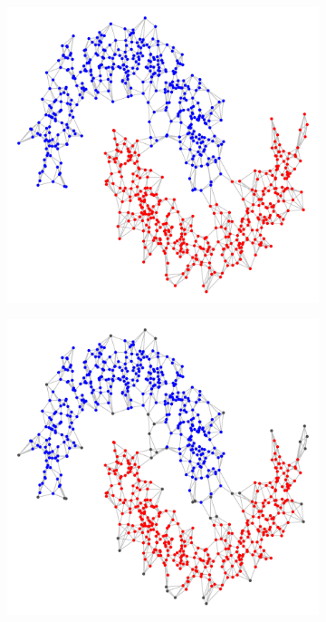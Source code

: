 \documentclass{article}
\newcommand{\1}{\mathbf{1}}
\theoremstyle{aldenthm}
\theoremstyle{aldenrmrk}
\begin{document}
\begin{figure}
\begin{adjustbox}{minipage=\linewidth}
\begin{subfigure}{.24\linewidth}
			\caption{}
		\end{subfigure}
		\begin{subfigure}{.24\linewidth}
			\includegraphics[width=\linewidth]{example2plots/row2_conductance_cluster}
			\caption{}
		\end{subfigure}
		\begin{subfigure}{.24\linewidth}
			\includegraphics[width=\linewidth]{example2plots/row2_density_cluster}
			\caption{}
		\end{subfigure}
		

\end{adjustbox}
\end{figure}
\end{document}
